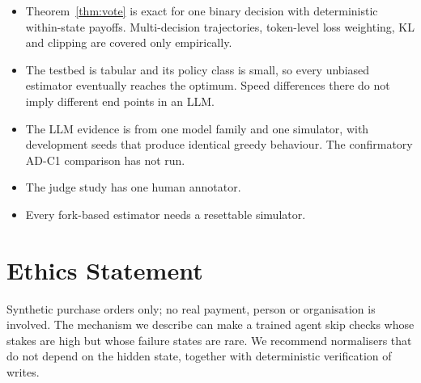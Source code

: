 \documentclass[11pt]{article}
\begin{document}
\begin{itemize}
\item Theorem~\ref{thm:vote} is exact for one binary decision with deterministic within-state payoffs. Multi-decision
trajectories, token-level loss weighting, KL and clipping are covered only empirically.
\item The testbed is tabular and its policy class is small, so every unbiased estimator eventually reaches the
optimum. Speed differences there do not imply different end points in an LLM.
\item The LLM evidence is from one model family and one simulator, with development seeds that produce identical
greedy behaviour. The confirmatory AD-C1 comparison has not run.
\item The judge study has one human annotator.
\item Every fork-based estimator needs a resettable simulator.
\end{itemize}

\section*{Ethics Statement}

Synthetic purchase orders only; no real payment, person or organisation is involved. The mechanism we describe can
make a trained agent skip checks whose stakes are high but whose failure states are rare. We recommend normalisers
that do not depend on the hidden state, together with deterministic verification of writes.




\appendix

\end{document}
